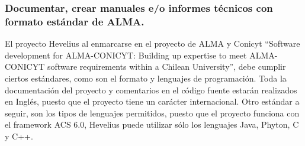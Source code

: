 \documentclass[letterpaper,spanish,10pt]{article}
\begin{document}
\subsubsection{Documentar, crear manuales e/o informes t\'ecnicos con formato est\'andar de ALMA.}
El proyecto Hevelius al enmarcarse en el proyecto de ALMA y Conicyt ``Software development for ALMA-CONICYT: Building up expertise to meet ALMA-CONICYT software requirements within a Chilean University'', debe cumplir ciertos est\'andares, como son el formato y lenguajes de programaci\'on. 
Toda la documentaci\'on del proyecto y comentarios en el c\'odigo fuente estar\'an realizados en Ingl\'es, puesto que el proyecto tiene un car\'acter internacional.
Otro est\'andar a seguir, son los tipos de lenguajes permitidos, puesto que el proyecto funciona con el framework ACS 6.0, Hevelius puede utilizar s\'olo los lenguajes Java, Phyton, C y C++.
\end{document}
